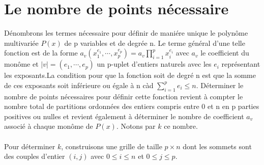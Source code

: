 \documentclass[a4paper,12pt]{article}
\begin{document}
\section{Le nombre de points nécessaire}
Dénombrons les termes nécessaire pour définir de maniére unique le polynôme multivariée $P(x)$ de p variables et de degrée n. Le terme général d'une telle fonction est de la forme $a_v(x^{e_1}_1,\cdots,x^{e_p}_p)=a_v\prod_{i=1}^{p}x^{e_i}_i$ avec $a_v$ le coefficient du monôme et $|v| = (e_1,\cdots,e_p)$ un p-uplet d'entiers naturels avec les $e_i$ représentant les exposants.La condition pour que la fonction soit de degré n est que la somme de ces exposants soit inférieure ou égale à n càd $ {\sum_{i=1}^{p}e_i}\leq n$. Déterminer le nombre de points nécessaires pour définir cette fonction revient à compter le nombre total de partitions ordonnées des entiers compris entre 0 et n en p parties positives ou nulles et revient également à déterminer le nombre de coefficient $a_v$ associé à chaque monôme de $P(x)$. Notons par $k$ ce nombre.\\
\\
Pour déterminer $k$, construisons une grille de taille $p \times n$ dont les sommets sont des couples d'entier $(i,j)$ avec $0 \leq i \leq n$ et $0 \leq j \leq p$.\\
\\
\end{document}
